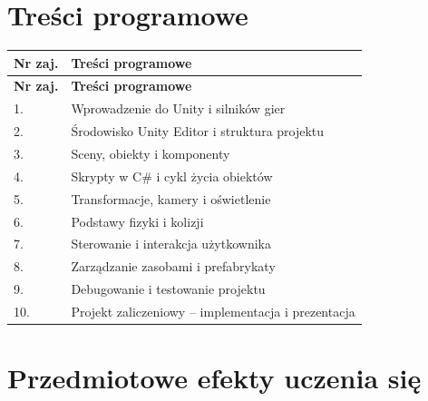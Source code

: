 \documentclass[12pt, a4paper]{article}
\newcommand{\thdrule}{\noalign{\global\setlength{\extrarowheight}{0pt}}}
\newcommand{\thdend}{\noalign{\global\setlength{\extrarowheight}{3pt}}}
\begin{document}
\section{Treści programowe}

{\scriptsize
\begin{longtable}{m{1.5cm}m{14.5cm}}
\thdrule\toprule
\rowcolor{pjatkRed} {\color{white}\textbf{Nr zaj.}} & {\color{white}\textbf{Treści programowe}} \\
\midrule\thdend
\endfirsthead
\thdrule\toprule
\rowcolor{pjatkRed} {\color{white}\textbf{Nr zaj.}} & {\color{white}\textbf{Treści programowe}} \\
\midrule\thdend
\endhead
  \rowcolor{tableRowLight} 1. & Wprowadzenie do Unity i silników gier \\
  \rowcolor{tableRowAlt} 2. & Środowisko Unity Editor i struktura projektu \\
  \rowcolor{tableRowLight} 3. & Sceny, obiekty i komponenty \\
  \rowcolor{tableRowAlt} 4. & Skrypty w C\# i cykl życia obiektów \\
  \rowcolor{tableRowLight} 5. & Transformacje, kamery i oświetlenie \\
  \rowcolor{tableRowAlt} 6. & Podstawy fizyki i kolizji \\
  \rowcolor{tableRowLight} 7. & Sterowanie i interakcja użytkownika \\
  \rowcolor{tableRowAlt} 8. & Zarządzanie zasobami i prefabrykaty \\
  \rowcolor{tableRowLight} 9. & Debugowanie i testowanie projektu \\
  \rowcolor{tableRowAlt} 10. & Projekt zaliczeniowy – implementacja i prezentacja \\
\bottomrule
\end{longtable}}

\section{Przedmiotowe efekty uczenia się}
\end{document}
